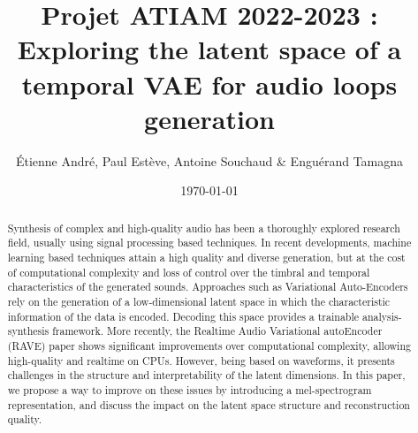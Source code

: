 \documentclass{article}
\title{Projet ATIAM 2022-2023 : Exploring the latent space of a temporal VAE for audio loops generation}
\author{Étienne André, Paul Estève, Antoine Souchaud \& Enguérand Tamagna}
\date{\today}
\begin{document}
\maketitle
\vfill
\hspace*{-3cm}\hspace*{1cm}


\begin{abstract}
    Synthesis of complex and high-quality audio has been a thoroughly explored research field, usually using signal processing based techniques. In recent developments, machine learning based techniques attain a high quality and diverse generation, but at the cost of computational complexity and loss of control over the timbral and temporal characteristics of the generated sounds. Approaches such as Variational Auto-Encoders \cite{kingmaAutoEncodingVariationalBayes2022} rely on the generation of a low-dimensional latent space in which the characteristic information of the data is encoded. Decoding this space provides a trainable analysis-synthesis framework. More recently, the Realtime Audio Variational autoEncoder (RAVE) paper\cite{caillonRAVEVariationalAutoencoder2021} shows significant improvements over computational complexity, allowing high-quality and realtime on CPUs. However, being based on waveforms, it presents challenges in the structure and interpretability of the latent dimensions. In this paper, we propose a way to improve on these issues by introducing a mel-spectrogram representation, and discuss the impact on the latent space structure and reconstruction quality.
\end{abstract}














\end{document}
